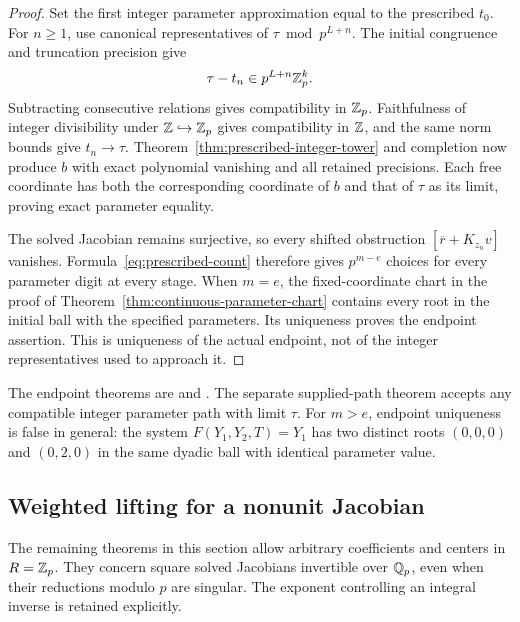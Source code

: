 \begin{proof}
Set the first integer parameter approximation equal to the prescribed
$t_0$. For $n\ge1$, use canonical representatives of
$\tau\bmod p^{L+n}$. The initial congruence and truncation precision give
\[
 \tau-t_n\in p^{L+n}\mathbb Z_p^k.
\]
Subtracting consecutive relations gives compatibility in $\mathbb Z_p$.
Faithfulness of integer divisibility under $\mathbb Z\hookrightarrow\mathbb Z_p$
gives compatibility in $\mathbb Z$, and the same norm bounds give $t_n\to\tau$.
Theorem~\ref{thm:prescribed-integer-tower} and completion now produce $b$
with exact polynomial vanishing and all retained precisions. Each free
coordinate has both the corresponding coordinate of $b$ and that of
$\tau$ as its limit, proving exact parameter equality.

The solved Jacobian remains surjective, so every shifted obstruction
$[\overline r+K_{z_n}v]$ vanishes. Formula~\eqref{eq:prescribed-count}
therefore gives $p^{m-e}$ choices for every parameter digit at every stage.
When $m=e$, the fixed-coordinate chart in the proof of
Theorem~\ref{thm:continuous-parameter-chart} contains every root in the
initial ball with the specified parameters. Its uniqueness proves the
endpoint assertion. This is uniqueness of the actual endpoint, not of the
integer representatives used to approach it.
\end{proof}

The endpoint theorems are
and .
The separate supplied-path theorem
accepts any compatible integer parameter path with limit $\tau$.
For $m>e$, endpoint uniqueness is false in general: the system
$F(Y_1,Y_2,T)=Y_1$ has two distinct roots $(0,0,0)$ and $(0,2,0)$ in the
same dyadic ball with identical parameter value.

\subsection{Weighted lifting for a nonunit Jacobian}

The remaining theorems in this section allow arbitrary coefficients and
centers in $R=\mathbb Z_p$. They concern square solved Jacobians invertible over
$\mathbb Q_p$, even when their reductions modulo $p$ are singular. The exponent
controlling an integral inverse is retained explicitly.

